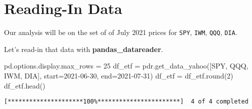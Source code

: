 \documentclass[
  letterpaper,
  DIV=11,
  numbers=noendperiod]{scrreprt}
\newenvironment{Shaded}{\begin{snugshade}}{\end{snugshade}}
\newcommand{\BuiltInTok}[1]{\textcolor[rgb]{0.00,0.23,0.31}{#1}}
\newcommand{\DecValTok}[1]{\textcolor[rgb]{0.68,0.00,0.00}{#1}}
\newcommand{\NormalTok}[1]{\textcolor[rgb]{0.00,0.23,0.31}{#1}}
\newcommand{\OperatorTok}[1]{\textcolor[rgb]{0.37,0.37,0.37}{#1}}
\newcommand{\StringTok}[1]{\textcolor[rgb]{0.13,0.47,0.30}{#1}}
\begin{document}
\hypertarget{reading-in-data-5}{%
\section{Reading-In Data}\label{reading-in-data-5}}

Our analysis will be on the set of of July 2021 prices for \texttt{SPY},
\texttt{IWM}, \texttt{QQQ}, \texttt{DIA}.

Let's read-in that data with \textbf{pandas\_datareader}.

\begin{Shaded}
\begin{Highlighting}[]
\NormalTok{pd.options.display.max\_rows }\OperatorTok{=} \DecValTok{25}
\NormalTok{df\_etf }\OperatorTok{=}\NormalTok{ pdr.get\_data\_yahoo([}\StringTok{\textquotesingle{}SPY\textquotesingle{}}\NormalTok{, }\StringTok{\textquotesingle{}QQQ\textquotesingle{}}\NormalTok{, }\StringTok{\textquotesingle{}IWM\textquotesingle{}}\NormalTok{, }\StringTok{\textquotesingle{}DIA\textquotesingle{}}\NormalTok{], start}\OperatorTok{=}\StringTok{\textquotesingle{}2021{-}06{-}30\textquotesingle{}}\NormalTok{, end}\OperatorTok{=}\StringTok{\textquotesingle{}2021{-}07{-}31\textquotesingle{}}\NormalTok{)}
\NormalTok{df\_etf }\OperatorTok{=}\NormalTok{ df\_etf.}\BuiltInTok{round}\NormalTok{(}\DecValTok{2}\NormalTok{)}
\NormalTok{df\_etf.head()}
\end{Highlighting}
\end{Shaded}

\begin{verbatim}
[*********************100%***********************]  4 of 4 completed
\end{verbatim}
\end{document}
